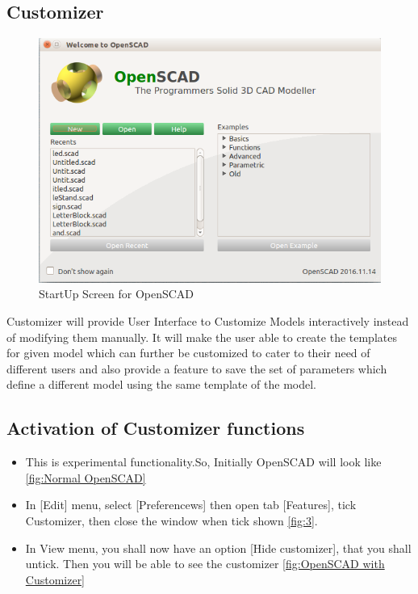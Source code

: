 \documentclass[12pt]{report}
\begin{document}
\subsection{Customizer}

\begin{figure}
	\centering \includegraphics[scale=0.60]{images/output/1.png}
	\caption{StartUp Screen for OpenSCAD}
	\label{fig:1}
\end{figure}

Customizer  will provide User Interface to Customize Models interactively instead of modifying them manually. It will make the user able to create the templates for given model which can further be customized to cater to their need of different users and also provide a feature to save the set of parameters which define a different model using the same template of the model.
\subsection{Activation of Customizer functions}
\begin{itemize}
	
	\item This is experimental functionality.So, Initially
	OpenSCAD will look like \ref{fig:Normal OpenSCAD}
	\item In [Edit] menu, select [Preferencews] then open tab [Features], tick Customizer, then close the window when tick shown \ref{fig:3}.
	\item In View menu, you shall now have an option [Hide customizer], that you shall untick. Then you will be able to see the customizer \ref{fig:OpenSCAD with Customizer}
	
\end{itemize}
\end{document}
